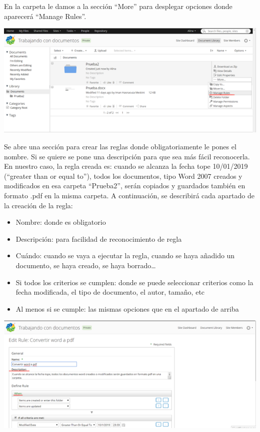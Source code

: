 \documentclass{article}
\begin{document}
En la carpeta le damos a la sección “More” para desplegar opciones donde aparecerá “Manage Rules”.

\begin{center}
\includegraphics[scale=0.7]{images/regla2.png}
\end{center}

Se abre una sección para crear las reglas donde obligatoriamente le pones el nombre. Si se quiere se pone una descripción para que sea más fácil reconocerla. En nuestro caso, la regla creada es: cuando se alcanza la fecha tope 10/01/2019 (“greater than or equal to”), todos los documentos, tipo Word 2007 creados y modificados en esa carpeta “Prueba2”, serán copiados y guardados también en formato .pdf en la misma carpeta.
A continuación, se describirá cada apartado de la creación de la regla:
\begin{itemize}
\item Nombre: donde es obligatorio
\item Descripción: para facilidad de reconocimiento de regla
\item Cuándo: cuando se vaya a ejecutar la regla, cuando se haya añadido un documento, se haya creado, se haya borrado…
\item Si todos los criterios se cumplen: donde se puede seleccionar criterios como la fecha modificada, el tipo de documento, el autor, tamaño, etc
\item Al menos si se cumple: las mismas opciones que en el apartado de arriba
\end{itemize}
     
\begin{center}
\includegraphics[scale=0.7]{images/regla3.png}
\end{center}
\end{document}
